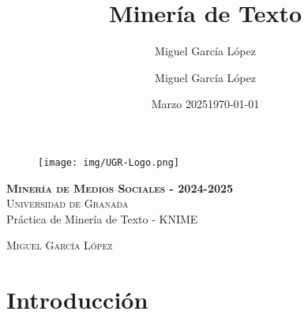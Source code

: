 \documentclass[12pt,letterpaper]{article}
\title{Minería de Texto}
\author{Miguel García López}
\date{Marzo 2025}
\author{Miguel García López} %
\date{\normalsize\today} %
\begin{document}
\begin{titlepage}
    \begin{figure}
        \vspace{-1.3cm}
        \begin{center}
            \texttt{[image: img/UGR-Logo.png]}
        \end{center}
    \end{figure}
    \vspace{1.3cm}
    \centering
    \normalfont \normalsize
    \textsc{\textbf{Minería de Medios Sociales - 2024-2025} \\\vspace{.15cm} Universidad de Granada} \\ [25pt]
    \huge Práctica de Minería de Texto - KNIME

    \normalfont \normalsize \vspace{.30cm}
    \textsc{Miguel García López}

\end{titlepage}

\tableofcontents
\listoffigures
\listoftables
\newpage

\section{Introducción}
\end{document}
